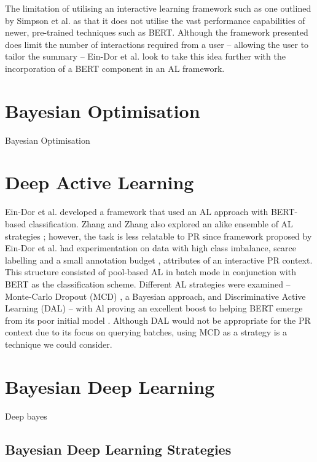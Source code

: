 \documentclass[ %
                    author={James Stephenson},
                supervisor={Dr. Edwin Simpson},
                    degree={MSc},
                     title={Project Plan: Bayesian Deep Learning For Extractive Test Summarisation},
                  subtitle={},
                      type={},
                      year={2022}]{../additions/dissertation}
\begin{document}
The limitation of utilising an interactive learning framework such as one outlined by Simpson et al. \cite{Simpson19} as that it does not utilise the vast performance capabilities of newer, pre-trained techniques such as BERT. Although the framework presented does limit the number of interactions required from a user – allowing the user to tailor the summary – Ein-Dor et al. \cite{EinDor20} look to take this idea further with the incorporation of a BERT component in an AL framework. 

		\section{Bayesian Optimisation}
		\label{chap:literaturereview:bo}
		
		Bayesian Optimisation

		
		\section{Deep Active Learning}
		\label{chap:literaturereview:deepactive}
		
		Ein-Dor et al. \cite{EinDor20} developed a framework that used an AL approach with BERT-based classification. Zhang and Zhang also explored an alike ensemble of AL strategies \cite{Zhang19}; however, the task is less relatable to PR since framework proposed by Ein-Dor et al. had experimentation on data with high class imbalance, scarce labelling and a small annotation budget \cite{EinDor20}, attributes of an interactive PR context.  This structure consisted of pool-based AL \cite{Settles09} in batch mode in conjunction with BERT as the classification scheme. Different AL strategies were examined – Monte-Carlo Dropout (MCD) \cite{Gal15}, a Bayesian approach, and Discriminative Active Learning (DAL) \cite{Gissin19} – with Al proving an excellent boost to helping BERT emerge from its poor initial model \cite{EinDor20}. Although DAL would not be appropriate for the PR context due to its focus on querying batches, using MCD as a strategy is a technique we could consider.
		
		\section{Bayesian Deep Learning}
		\label{chap:literaturereview:deepbayes}
		
		Deep bayes
		
			\subsection{Bayesian Deep Learning Strategies}
			\label{chap:literaturereview:deepbayes:strategies}
			
\end{document}

